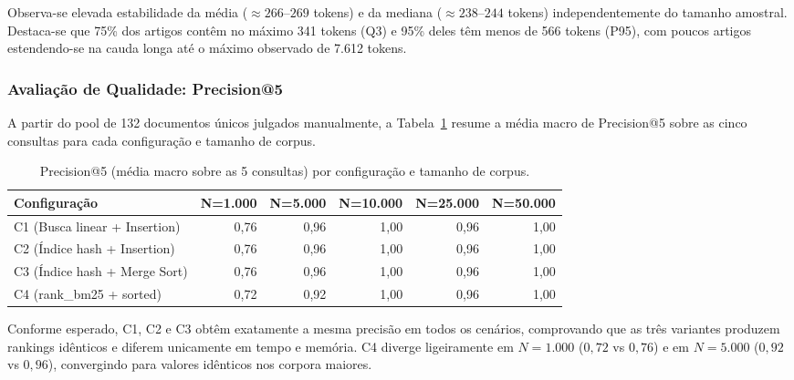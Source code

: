 \documentclass[12pt, a4paper]{article}
\begin{document}
Observa-se elevada estabilidade da média ($\approx 266\text{--}269$ tokens) e da mediana ($\approx 238\text{--}244$ tokens) independentemente do tamanho amostral. Destaca-se que 75\% dos artigos contêm no máximo 341 tokens (Q3) e 95\% deles têm menos de 566 tokens (P95), com poucos artigos estendendo-se na cauda longa até o máximo observado de 7.612 tokens.

\subsubsection{Avaliação de Qualidade: Precision@5}

A partir do pool de 132 documentos únicos julgados manualmente, a Tabela~\ref{tab:precision} resume a média macro de Precision@5 sobre as cinco consultas para cada configuração e tamanho de corpus.

\begin{table}[H]
\centering
\small
\caption{Precision@5 (média macro sobre as 5 consultas) por configuração e tamanho de corpus.}
\label{tab:precision}
\begin{tabular}{lrrrrr}
\hline
\textbf{Configuração} & \textbf{N=1.000} & \textbf{N=5.000} & \textbf{N=10.000} & \textbf{N=25.000} & \textbf{N=50.000} \\
\hline
C1 (Busca linear + Insertion)   & 0,76 & 0,96 & 1,00 & 0,96 & 1,00 \\
C2 (Índice hash + Insertion)    & 0,76 & 0,96 & 1,00 & 0,96 & 1,00 \\
C3 (Índice hash + Merge Sort)   & 0,76 & 0,96 & 1,00 & 0,96 & 1,00 \\
C4 (rank\_bm25 + sorted)        & 0,72 & 0,92 & 1,00 & 0,96 & 1,00 \\
\hline
\end{tabular}
\end{table}

Conforme esperado, C1, C2 e C3 obtêm exatamente a mesma precisão em todos os cenários, comprovando que as três variantes produzem rankings idênticos e diferem unicamente em tempo e memória. C4 diverge ligeiramente em $N=1.000$ ($0{,}72$ vs $0{,}76$) e em $N=5.000$ ($0{,}92$ vs $0{,}96$), convergindo para valores idênticos nos corpora maiores.
\end{document}
